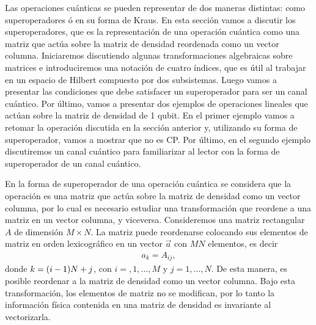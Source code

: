 Las operaciones cuánticas se pueden representar de dos 
maneras distintas: como superoperadores ó  en su forma
de Kraus. En esta sección vamos a discutir los superoperadores, 
que es la representación de una operación cuántica como 
una matriz que actúa sobre la matriz de densidad reordenada
como un vector columna.
Iniciaremos discutiendo algunas
transformaciones algebraicas sobre matrices e introduciremos 
una notación de cuatro índices, que es útil al trabajar en un espacio de Hilbert 
compuesto por dos subsistemas. Luego vamos a presentar 
las condiciones que debe satisfacer un superoperador para ser un 
canal cuántico. Por último, vamos a presentar dos ejemplos de operaciones
lineales que actúan sobre la matriz de densidad de 1 qubit. En el primer 
ejemplo vamos a retomar la operación discutida en la sección anterior y, 
utilizando su forma de superoperador, vamos a mostrar que no es CP. 
Por último, en el segundo ejemplo discutiremos un canal cuántico
para familiarizar al lector con la forma de superoperador de un canal cuántico.

En la forma de superoperador de una operación cuántica se 
considera que la operación es una matriz que actúa sobre la matriz de densidad 
como un vector columna, por lo cual es necesario estudiar una 
transformación que reordene a una matriz en un vector columna, y viceversa.
Consideremos una matriz rectangular $A$ de dimensión $M\times N$.
La matriz puede reordenarse colocando sus elementos de matriz en 
orden lexicográfico en un vector $\vec{a}$ con $MN$ elementos, es decir
\begin{align}
a_k=A_{ij}, 
\label{eq:matrix-to-vector}
\end{align}
donde $k=\qty(i-1)N+j$, con $i=,1,\ldots,M$ y $j=1,\ldots,N$. De
esta manera, es posible reordenar a la matriz de densidad como un 
vector columna. Bajo esta transformación, los elementos de matriz no se 
modifican, por lo tanto la información física contenida en una matriz 
de densidad es invariante al vectorizarla.

